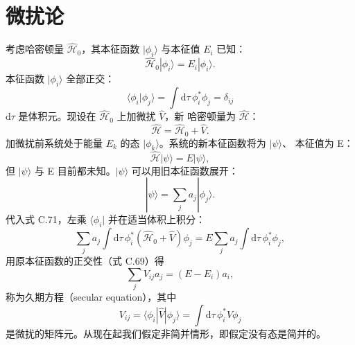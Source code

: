 \section{微扰论}

考虑哈密顿量 $\hat{\mathcal{H}}_0$，其本征函数 $|\phi_i\rangle$ 与本征值 $E_i$
已知：
\begin{equation*}
\hat{\mathcal{H}}_0|\phi_i\rangle = E_i|\phi_i\rangle.\tag{C.68}
\end{equation*}
本征函数 $|\phi_i\rangle$ 全部正交：
\begin{equation*}
\langle\phi_i|\phi_j\rangle = \int\mathrm{d}\tau\,\phi_i^{*}\phi_j = \delta_{ij}\tag{C.69}
\end{equation*}
$\mathrm{d}\tau$ 是体积元。现设在 $\hat{\mathcal{H}}_0$ 上加微扰 $\hat{V}$，新
哈密顿量为 $\hat{\mathcal{H}}$：
\begin{equation*}
\hat{\mathcal{H}} = \hat{\mathcal{H}}_0 + \hat{V}.\tag{C.70}
\end{equation*}
加微扰前系统处于能量 $E_k$ 的态 $|\phi_k\rangle$。系统的新本征函数将为 $|\psi\rangle$、
本征值为 E：
\begin{equation*}
\hat{\mathcal{H}}|\psi\rangle = E|\psi\rangle,\tag{C.71}
\end{equation*}
但 $|\psi\rangle$ 与 E 目前都未知。$|\psi\rangle$ 可以用旧本征函数展开：
\begin{equation*}
|\psi\rangle = \sum_ja_j|\phi_j\rangle.\tag{C.72}
\end{equation*}
代入式 C.71，左乘 $\langle\phi_i|$ 并在适当体积上积分：
\begin{equation*}
\sum_ja_j\int\mathrm{d}\tau\,\phi_i^{*}(\hat{\mathcal{H}}_0+\hat{V})\phi_j = E\sum_ja_j\int\mathrm{d}\tau\,\phi_i^{*}\phi_j,\tag{C.73}
\end{equation*}
用原本征函数的正交性（式 C.69）得
\begin{equation*}
\sum_jV_{ij}a_j = (E-E_i)a_i,\tag{C.74}
\end{equation*}
称为久期方程（secular equation），其中
\begin{equation*}
V_{ij} = \langle\phi_i|\hat{V}|\phi_j\rangle = \int\mathrm{d}\tau\,\phi_i^{*}\hat{V}\phi_j\tag{C.75}
\end{equation*}
是微扰的矩阵元。从现在起我们假定非简并情形，即假定没有态是简并的。

